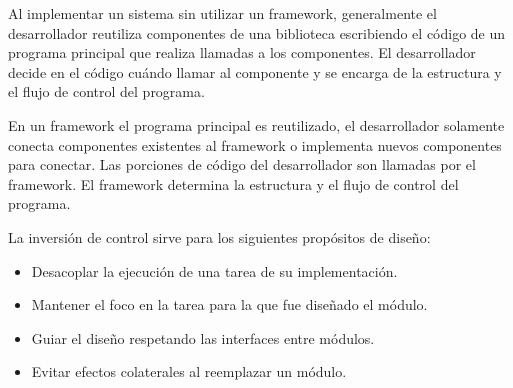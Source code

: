 Al implementar un sistema sin utilizar un framework, generalmente el
desarrollador reutiliza componentes de una biblioteca escribiendo el código de
un programa principal que realiza llamadas a los componentes. El desarrollador
decide en el código cuándo llamar al componente y se encarga de la estructura y
el flujo de control del programa.

En un framework el programa principal es reutilizado, el
desarrollador solamente conecta componentes existentes al framework o
implementa nuevos componentes para conectar. Las porciones de código del
desarrollador son llamadas por el framework. El framework determina la
estructura y el flujo de control del programa.

La inversión de control sirve para los siguientes propósitos de diseño:
\begin{itemize}
  \item Desacoplar la ejecución de una tarea de su implementación.
  \item Mantener el foco en la tarea para la que fue diseñado el módulo.
  \item Guiar el diseño respetando las interfaces entre módulos.
  \item Evitar efectos colaterales al reemplazar un módulo.
\end{itemize}

